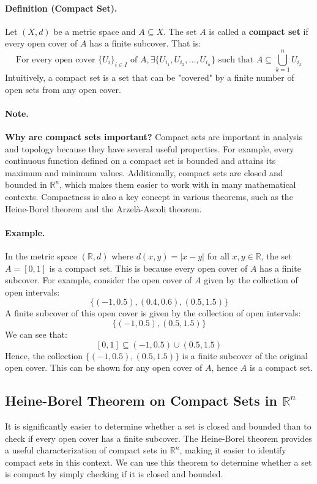 \documentclass[openany]{book}
\numberwithin{equation}{section}
\begin{document}
\paragraph{Definition (Compact Set).}

    Let $(X, d)$ be a metric space and $A \subseteq X$. The set $A$ is called a \textbf{compact set} if every open cover of $A$ has a finite subcover. That is:
    $$\text{For every open cover } \{U_i\}_{i \in I} \text{ of } A, \exists \{U_{i_1}, U_{i_2}, ..., U_{i_n}\} \text{ such that } A \subseteq \bigcup_{k=1}^{n} U_{i_k}$$
    Intuitively, a compact set is a set that can be "covered" by a finite number of open sets from any open cover.
\par
\paragraph{Note.}

\textbf{Why are compact sets important?} Compact sets are important in analysis and topology because they have several useful properties. For example, every continuous function defined on a compact set is bounded and attains its maximum and minimum values. Additionally, compact sets are closed and bounded in $\mathbb{R}^n$, which makes them easier to work with in many mathematical contexts. Compactness is also a key concept in various theorems, such as the Heine-Borel theorem and the Arzelà-Ascoli theorem.
\par
\paragraph{Example.}

    In the metric space $(\mathbb{R}, d)$ where $d(x, y) = |x - y|$ for all $x, y \in \mathbb{R}$, the set $A = [0, 1]$ is a compact set. This is because every open cover of $A$ has a finite subcover. For example, consider the open cover of $A$ given by the collection of open intervals:
    $$\{(-1, 0.5), (0.4, 0.6), (0.5, 1.5)\}$$
    A finite subcover of this open cover is given by the collection of open intervals:
    $$\{(-1, 0.5), (0.5, 1.5)\}$$
    We can see that:
    $$[0, 1] \subseteq (-1, 0.5) \cup (0.5, 1.5)$$
    Hence, the collection $\{(-1, 0.5), (0.5, 1.5)\}$ is a finite subcover of the original open cover. This can be shown for any open cover of $A$, hence $A$ is a compact set.
\par
\subsection{Heine-Borel Theorem on Compact Sets in $\mathbb{R}^n$}
It is significantly easier to determine whether a set is closed and bounded than to check if every open cover has a finite subcover. The Heine-Borel theorem provides a useful characterization of compact sets in $\mathbb{R}^n$, making it easier to identify compact sets in this context. We can use this theorem to determine whether a set is compact by simply checking if it is closed and bounded.
\end{document}
